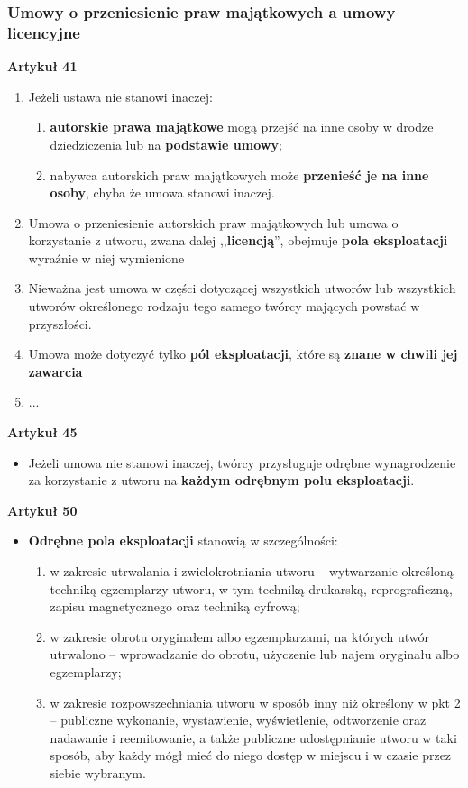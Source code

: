 \documentclass[12pt,a4paper]{article}
\begin{document}
\subsubsection{Umowy o przeniesienie praw majątkowych a umowy licencyjne}
\textbf{Artykuł 41}
\begin{enumerate}
\item Jeżeli ustawa nie  stanowi inaczej:
	\begin{enumerate}
		\item  \textbf{autorskie prawa majątkowe} mogą przejść na inne osoby w drodze dziedziczenia lub na \textbf{podstawie umowy};
		\item nabywca autorskich praw majątkowych może \textbf{przenieść je na inne osoby}, chyba że umowa stanowi inaczej.
	\end{enumerate}
\item Umowa o przeniesienie autorskich praw majątkowych lub umowa o korzystanie
z utworu, zwana dalej ,,\textbf{licencją}'', obejmuje \textbf{pola eksploatacji} wyraźnie w niej wymienione
\item Nieważna jest umowa w części dotyczącej wszystkich utworów lub wszystkich utworów określonego rodzaju tego samego twórcy mających powstać w przyszłości.
\item  Umowa może dotyczyć tylko \textbf{pól eksploatacji}, które są \textbf{znane w chwili jej zawarcia}
\item ...%
\end{enumerate}
\textbf{Artykuł 45}
\begin{itemize}
\item Jeżeli umowa nie stanowi inaczej, twórcy przysługuje odrębne wynagrodzenie za korzystanie z utworu na \textbf{każdym odrębnym polu eksploatacji}.
\end{itemize}
\textbf{Artykuł 50}
\begin{itemize}
\item \textbf{Odrębne pola eksploatacji} stanowią w szczególności:
\begin{enumerate}
\item w zakresie utrwalania i zwielokrotniania utworu – wytwarzanie określoną
techniką egzemplarzy utworu, w tym techniką drukarską, reprograficzną,
zapisu magnetycznego oraz techniką cyfrową;
\item w zakresie obrotu oryginałem albo egzemplarzami, na których utwór utrwalono – wprowadzanie do obrotu, użyczenie lub najem oryginału albo egzemplarzy;
\item w zakresie rozpowszechniania utworu w sposób inny niż określony w pkt 2 – publiczne wykonanie, wystawienie, wyświetlenie, odtworzenie oraz nadawanie i reemitowanie, a także publiczne udostępnianie utworu w taki sposób, aby każdy mógł mieć do niego dostęp w miejscu i w czasie przez siebie wybranym.
\end{enumerate}
\end{itemize}
\end{document}
